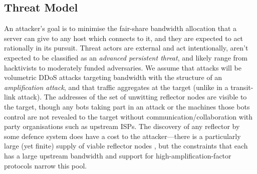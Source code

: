 \documentclass[10pt, times, comsoc]{IEEEtran}
\begin{document}
%

\subsection{Threat Model}
An attacker's goal is to minimise the fair-share bandwidth allocation that a server can give to any host which connects to it, and they are expected to act rationally in its pursuit.
Threat actors are external and act intentionally, aren't expected to be classified as an \emph{advanced persistent threat}, and likely range from hacktivists to moderately funded adversaries.
We assume that attacks will be volumetric DDoS attacks targeting bandwidth with the structure of an \emph{amplification attack}, and that traffic aggregates at the target (unlike in a transit-link attack).
The addresses of the set of unwitting reflector nodes are visible to the target, though any bots taking part in an attack or the machines those bots control are not revealed to the target without communication/collaboration with  party organisations such as upstream ISPs.
The discovery of any reflector by some defence system does have a cost to the attacker---there is a particularly large (yet finite) supply of viable reflector nodes \cite{DBLP:conf/ndss/Rossow14}, but the constraints that each has a large upstream bandwidth and support for high-amplification-factor protocols narrow this pool.
\end{document}
